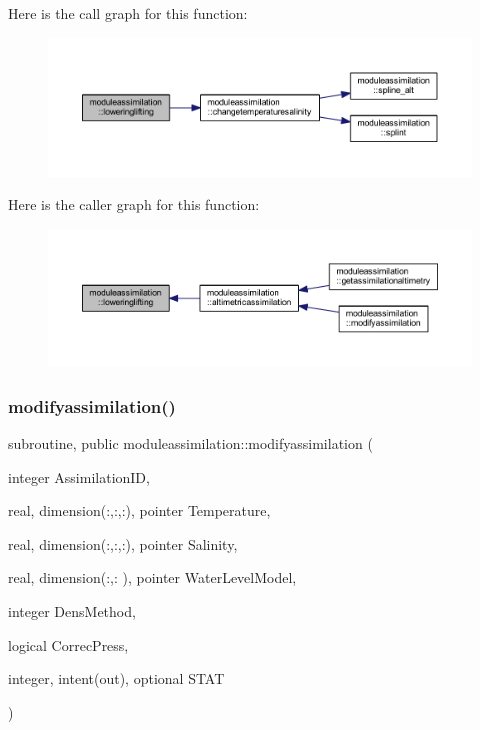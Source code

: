 Here is the call graph for this function\+:\nopagebreak
\begin{figure}[H]
\begin{center}
\leavevmode
\includegraphics[width=350pt]{namespacemoduleassimilation_adb4698b9b7aa680222581e31452094dc_cgraph}
\end{center}
\end{figure}
Here is the caller graph for this function\+:\nopagebreak
\begin{figure}[H]
\begin{center}
\leavevmode
\includegraphics[width=350pt]{namespacemoduleassimilation_adb4698b9b7aa680222581e31452094dc_icgraph}
\end{center}
\end{figure}
\mbox{\label{namespacemoduleassimilation_a5932eaba41c6bd73ade2cb009b3824e8}} 
\subsubsection{\texorpdfstring{modifyassimilation()}{modifyassimilation()}}
{\footnotesize\ttfamily subroutine, public moduleassimilation\+::modifyassimilation (\begin{DoxyParamCaption}\item[{integer}]{Assimilation\+ID,  }\item[{real, dimension(\+:,\+:,\+:), pointer}]{Temperature,  }\item[{real, dimension(\+:,\+:,\+:), pointer}]{Salinity,  }\item[{real, dimension(\+:,\+:  ), pointer}]{Water\+Level\+Model,  }\item[{integer}]{Dens\+Method,  }\item[{logical}]{Correc\+Press,  }\item[{integer, intent(out), optional}]{S\+T\+AT }\end{DoxyParamCaption})}

